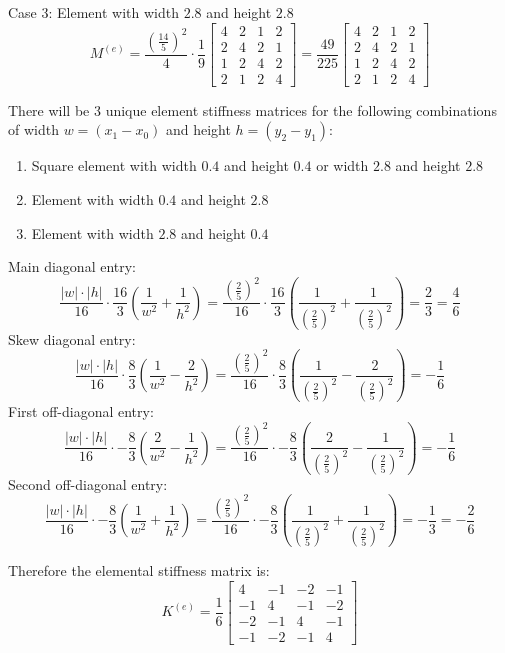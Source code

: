 \documentclass[12pt]{article}
\begin{document}
Case 3: Element with width $2.8$ and height $2.8$
\[M^{(e)} = \frac{(\frac{14}{5})^2}{4} \cdot \frac{1}{9}
\begin{bmatrix}
4 & 2 & 1 & 2 \\
2 & 4 & 2 & 1 \\
1 & 2 & 4 & 2 \\
2 & 1 & 2 & 4
\end{bmatrix} = \frac{49}{225}
\begin{bmatrix}
4 & 2 & 1 & 2 \\
2 & 4 & 2 & 1 \\
1 & 2 & 4 & 2 \\
2 & 1 & 2 & 4
\end{bmatrix}\]

There will be 3 unique element stiffness matrices for the following combinations of width $w=(x_1 - x_0)$ and height $h=(y_2 - y_1)$:
\begin{enumerate}
    \item Square element with width $0.4$ and height $0.4$ or width $2.8$ and height $2.8$
    \item Element with width $0.4$ and height $2.8$
    \item Element with width $2.8$ and height $0.4$
\end{enumerate}


Main diagonal entry:
\[\frac{ |w| \cdot |h|}{16} \cdot \frac{16}{3} \left(\frac{1}{w^2} + \frac{1}{h^2}\right) = \frac{(\frac{2}{5})^2}{16} \cdot \frac{16}{3} \left(\frac{1}{(\frac{2}{5})^2} + \frac{1}{(\frac{2}{5})^2}\right)= \frac{2}{3} = \frac{4}{6}\]
Skew diagonal entry:
\[\frac{|w|\cdot |h|}{16} \cdot \frac{8}{3} \left(\frac{1}{w^2} - \frac{2}{h^2}\right) = \frac{(\frac{2}{5})^2}{16} \cdot \frac{8}{3} \left(\frac{1}{(\frac{2}{5})^2} - \frac{2}{(\frac{2}{5})^2}\right)= -\frac{1}{6}\]
First off-diagonal entry:
\[\frac{|w|\cdot |h|}{16} \cdot -\frac{8}{3} \left(\frac{2}{w^2} - \frac{1}{h^2}\right) = \frac{(\frac{2}{5})^2}{16} \cdot -\frac{8}{3} \left(\frac{2}{(\frac{2}{5})^2} - \frac{1}{(\frac{2}{5})^2}\right)= -\frac{1}{6}\]
Second off-diagonal entry:
\[\frac{|w|\cdot |h|}{16} \cdot -\frac{8}{3} \left(\frac{1}{w^2} + \frac{1}{h^2}\right) = \frac{(\frac{2}{5})^2}{16} \cdot -\frac{8}{3} \left(\frac{1}{(\frac{2}{5})^2} + \frac{1}{(\frac{2}{5})^2}\right)= -\frac{1}{3} = -\frac{2}{6}\]

Therefore the elemental stiffness matrix is:
\[K^{(e)} = \frac{1}{6}
\begin{bmatrix}
4 & -1 & -2 & -1 \\
-1 & 4 & -1 & -2 \\
-2 & -1 & 4 & -1 \\
-1 & -2 & -1 & 4
\end{bmatrix}\]
\end{document}
